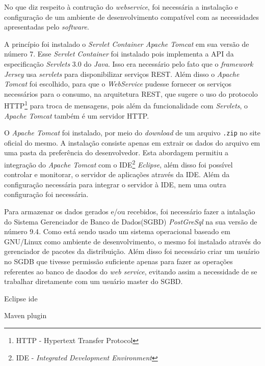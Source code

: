 
	\par No que diz respeito à contrução do \textit{webservice}, foi necessária a
instalação e configuração de um ambiente de desenvolvimento compatível com as
necessidades apresentadas pelo \textit{software}. 

	\par A princípio foi instalado o \textit{Servlet Container Apache Tomcat} em
sua versão de número 7. Esse \textit{Servlet Container} foi instalado pois
implementa a API da especificação \textit{Servlets} 3.0 do \textit{Java}. Isso
era necessário pelo fato que o \textit{framework Jersey} usa \textit{servlets}
para disponibilizar serviços REST. Além disso o \textit{Apache Tomcat} foi
escolhido, para que o \textit{WebService} pudesse fornecer os serviços
necessários para o consumo, na arquitetura REST, que sugere o uso do protocolo
HTTP\footnote{HTTP - Hypertext Transfer Protocol} para troca de mensagens, pois
além da funcionalidade com \textit{Servlets}, o \textit{Apache Tomcat} também é
um servidor HTTP.
	
	\par O \textit{Apache Tomcat} foi instalado, por meio do \textit{download} de
um arquivo \texttt{.zip} no site oficial do mesmo. A instalação consiste apenas
em extrair os dados do arquivo em uma pasta da preferência do desenvolvedor.
Esta abordagem permitiu a integração do \textit{Apache Tomcat} com o
IDE\footnote{IDE - \textit{Integrated Development Environment}}
\textit{Eclipse}, além disso foi possível controlar e monitorar, o servidor de
aplicações através da IDE. Além da configuração necessária para integrar o
servidor à IDE, nem uma outra configuração foi necessária.

			
	\par Para armazenar os dados gerados e/ou recebidos, foi necessário fazer a
intalação do Sistema Gerenciador de Banco de Dados(SGBD) \textit{PostGreSql} na
sua versão de número {9.4}. Como está sendo usado um sistema operacional
baseado em GNU/Linux como ambiente de desenvolvimento, o mesmo foi instalado através do
gerenciador de pacotes da distribuição. Além disso foi necessário criar um
usuário no SGDB que tivesse permissão suficiente apenas para fazer as operações
referentes ao banco de daodos do \textit{web service}, evitando assim a
necessidade de se trabalhar diretamente com um usuário master do SGBD. 

	\par Eclipse ide
	\par Maven plugin
